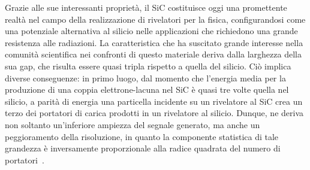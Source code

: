 Grazie alle sue interessanti proprietà, il SiC costituisce oggi una promettente realtà nel campo della realizzazione di rivelatori per la fisica, configurandosi come una potenziale alternativa al silicio nelle applicazioni che richiedono una grande resistenza alle radiazioni.
%
La caratteristica che ha suscitato grande interesse nella comunità scientifica nei confronti di questo materiale deriva dalla larghezza della sua gap, che risulta essere quasi tripla rispetto a quella del silicio.
Ciò implica diverse conseguenze: in primo luogo, dal momento che l'energia media per la produzione di una coppia elettrone-lacuna nel SiC è quasi tre volte quella nel silicio, a parità di energia una particella incidente su un rivelatore al SiC crea un terzo dei portatori di carica prodotti in un rivelatore al silicio.
Dunque, ne deriva non soltanto un'inferiore ampiezza del segnale generato, ma anche un peggioramento della risoluzione, in quanto la componente statistica di tale grandezza è inversamente proporzionale alla radice quadrata del numero di portatori~\cite{knoll:10}.
%
